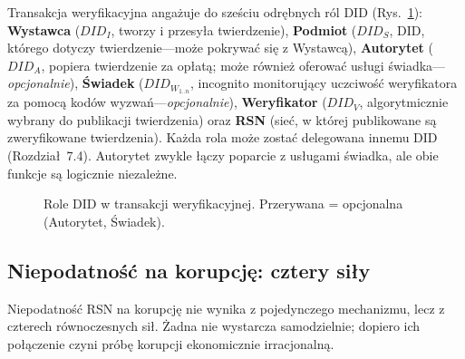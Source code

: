 \documentclass[11pt,a4paper,twocolumn]{article}
\begin{document}
Transakcja weryfikacyjna angażuje do sześciu odrębnych ról DID (Rys.~\ref{fig:roles}): \textbf{Wystawca} ($DID_I$, tworzy i przesyła twierdzenie), \textbf{Podmiot} ($DID_S$, DID, którego dotyczy twierdzenie---może pokrywać się z Wystawcą), \textbf{Autorytet} ($DID_A$, popiera twierdzenie za opłatą; może również oferować usługi świadka---\emph{opcjonalnie}), \textbf{Świadek} ($DID_{W_{1..n}}$, incognito monitorujący uczciwość weryfikatora za pomocą kodów wyzwań---\emph{opcjonalnie}), \textbf{Weryfikator} ($DID_V$, algorytmicznie wybrany do publikacji twierdzenia) oraz \textbf{RSN} (sieć, w której publikowane są zweryfikowane twierdzenia). Każda rola może zostać delegowana innemu DID (Rozdział~7.4). Autorytet zwykle łączy poparcie z usługami świadka, ale obie funkcje są logicznie niezależne.

\begin{figure}[ht]
\centering
{}
\caption{Role DID w transakcji weryfikacyjnej. Przerywana = opcjonalna (Autorytet, Świadek).}
\label{fig:roles}
\end{figure}

\subsection{Niepodatność na korupcję: cztery siły}

Niepodatność RSN na korupcję nie wynika z pojedynczego mechanizmu, lecz z czterech równoczesnych sił. Żadna nie wystarcza samodzielnie; dopiero ich połączenie czyni próbę korupcji ekonomicznie irracjonalną.
\end{document}
